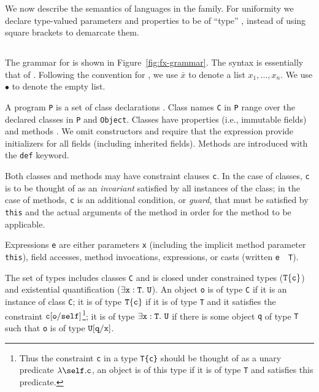 \newcommand{\constraint}{{\tt constraint}}
\newcommand\cj[2]{{#1} \vdash {#2}~\constraint}
\newcommand\cjj[3]{{#1} \vdash {#2}~\constraint, {#3}~\constraint}
\newcommand\wj[2]{{#1} \vdash {#2}~\type}
\newcommand\tj[3]{{#1} \vdash {#2} \ty {#3}}
\newcommand\stj[3]{{#1} \vdash {#2} \subtype {#3}}

We now describe the semantics of languages in the \FX{} family.
For uniformity we declare type-valued parameters and properties
to be of ``type'' \type, instead of using square brackets to demarcate
them.


\subsection{\FXZ}

The grammar for \FXZ{} is shown in Figure~\ref{fig:fx-grammar}.
The syntax is essentially that of \FJ{}.
Following the convention for \FJ{}, we use $\bar{x}$ to denote a
list $x_1, \dots, x_n$.  We use $\bullet$ to denote the empty
list.

A program {\tt P} is a set of class declarations .
Class names {\tt C} in {\tt P} range over the declared classes in {\tt P} 
and {\tt Object}.
Classes have
properties (i.e., immutable fields)  and methods .  We omit constructors
and require that the \new{} expression provide initializers
for all fields (including inherited fields). 
Methods are introduced with the {\tt def} keyword.

Both classes and methods may have constraint clauses
{\tt c}.  In the case of classes, {\tt c} is to be thought of as an
{\em invariant} satisfied by all instances of the class; in the case of
methods, {\tt c} is an additional condition, or {\em guard},
that must be satisfied by
{\tt this} and the actual arguments of the method in order for the method to
be applicable.

Expressions {\tt e} are either parameters {\tt x} (including the implicit
method parameter {\tt this}), field accesses, method invocations, \new{}
expressions, or casts (written {\tt e}~\as~{\tt T}).

The set of types includes classes {\tt C} and is closed under
constrained types ($\tt T\{c\}$) and existential
quantification ($\exists \tt x:T.~U$).
An object {\tt o} is of type {\tt C} if it is an instance of class {\tt C}; it is of type $\tt
T\{c\}$ if it is of type {\tt T} and it satisfies the constraint $\tt
c[o/self]$\footnote{Thus the constraint {\tt c} in a type {\tt T\{c\}}
should be thought of as a unary predicate $\lambda\self.{\tt c}$, an
object is of this type if it is of type {\tt T} and satisfies this
predicate.}; it is of type $\exists \tt x:T.~U$
if there is some object {\tt q}
of type {\tt T} such that {\tt o} is of type
$\tt U[q/x]$.


